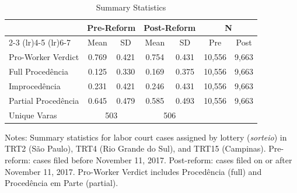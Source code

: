 \begin{table}[t]
\centering
\caption{Summary Statistics}
\label{tab:summary}
\begin{tabular}{lcccccc}
\hline\hline
 & \multicolumn{2}{c}{Pre-Reform} & \multicolumn{2}{c}{Post-Reform} & \multicolumn{2}{c}{N} \\
\cmidrule(lr){2-3} \cmidrule(lr){4-5} \cmidrule(lr){6-7}
 & Mean & SD & Mean & SD & Pre & Post \\
\hline
Pro-Worker Verdict & 0.769 & 0.421 & 0.754 & 0.431 & 10,556 & 9,663 \\
Full Proced\^{e}ncia & 0.125 & 0.330 & 0.169 & 0.375 & 10,556 & 9,663 \\
Improced\^{e}ncia & 0.231 & 0.421 & 0.246 & 0.431 & 10,556 & 9,663 \\
Partial Proced\^{e}ncia & 0.645 & 0.479 & 0.585 & 0.493 & 10,556 & 9,663 \\
\hline
Unique Varas & \multicolumn{2}{c}{503} & \multicolumn{2}{c}{506} & & \\
\hline
\end{tabular}
\begin{flushleft}\small
Notes: Summary statistics for labor court cases assigned by lottery (\textit{sorteio}) in TRT2 (S\~{a}o Paulo), TRT4 (Rio Grande do Sul), and TRT15 (Campinas). Pre-reform: cases filed before November 11, 2017. Post-reform: cases filed on or after November 11, 2017. Pro-Worker Verdict includes Proced\^{e}ncia (full) and Proced\^{e}ncia em Parte (partial).
\end{flushleft}
\end{table}
